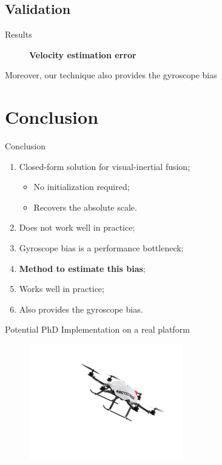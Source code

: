\documentclass{beamer}
\begin{document}
\subsection{Validation}

\begin{frame}{Results}
  \begin{figure}[h!]
    \centering
    \textbf{Velocity estimation error}\\
    \vspace{1em}

    \resizebox{0.5\textwidth}{!}{}
  \end{figure}

  Moreover, our technique also provides the gyroscope bias

\end{frame}

\section{Conclusion}

\begin{frame}{Conclusion}

  \begin{enumerate}
  \item Closed-form solution for visual-inertial fusion;
    \begin{itemize}
      \item No initialization required;
      \item Recovers the absolute scale.
    \end{itemize}
  \item<2-> Does not work well in practice;
  \item<3-> Gyroscope bias is a performance bottleneck;
  \item<4-> \textbf{Method to estimate this bias};
  \item<5-> Works well in practice;
  \item<6-> Also provides the gyroscope bias.
  \end{enumerate}

\end{frame}

\begin{frame}{Potential PhD}
  Implementation on a real platform
  \begin{figure}[h!]
    \centering
    \includegraphics[width=0.6\textwidth]{images/drone.png}
  \end{figure}

\end{frame}
\end{document}
